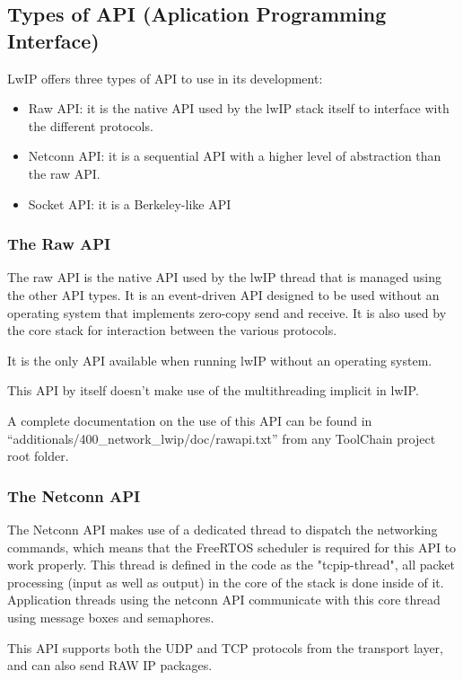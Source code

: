 \subsection { Types of API (Aplication Programming Interface) }
LwIP offers three types of API to use in its development:
\begin{itemize}
  \item Raw API: it is the native API used by the lwIP stack itself to interface with the different protocols.
  \item Netconn API: it is a sequential API with a higher level of abstraction than the raw API.
  \item Socket API: it is a Berkeley-like API
\end{itemize}

\subsubsection { The Raw API }

The raw API is the native API used by the lwIP thread that is managed using the other API types. It is an event-driven API designed to be used without an operating system that implements zero-copy send and receive. It is also used by the core stack for interaction between the various protocols.

It is the only API available when running lwIP without an operating system.

This API by itself doesn't make use of the multithreading implicit in lwIP.

A complete documentation on the use of this API can be found in ``additionals/400\_network\_lwip/doc/rawapi.txt'' from any ToolChain project root folder.

\subsubsection { The Netconn API }

The Netconn API makes use of a dedicated thread to dispatch the networking commands, which means that the FreeRTOS scheduler is required for this API to work properly. This thread is defined in the code as the "tcpip-thread", all packet processing (input as well as output) in the core of the stack is done inside of it. Application threads using the netconn API communicate with this core thread using message boxes and semaphores.

This API supports both the UDP and TCP protocols from the transport layer, and can also send RAW IP packages.

